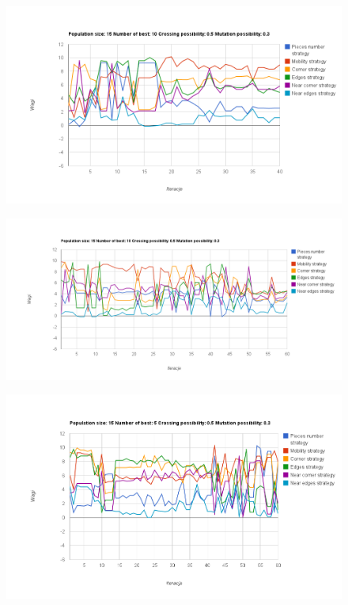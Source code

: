 \pagebreak

\begin{figure}[h!]
\centering
\includegraphics[width=\textwidth]{img/chart3.png}
\end{figure}

\begin{figure}[h!]
\centering
\includegraphics[width=\textwidth]{img/chart4.png}
\end{figure}

\pagebreak

\begin{figure}[h!]
\centering
\includegraphics[width=\textwidth]{img/chart5.png}
\end{figure}

